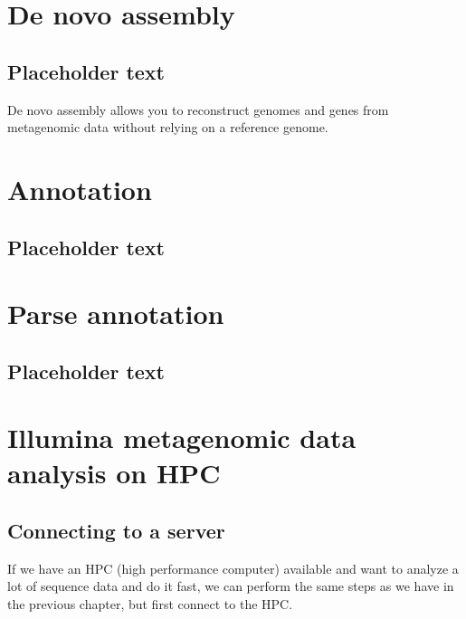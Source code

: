 \documentclass[
  letterpaper,
  DIV=11,
  numbers=noendperiod]{scrreprt}
\begin{document}

\chapter{De novo assembly}\label{de-novo-assembly}

\section{Placeholder text}\label{placeholder-text}

De novo assembly allows you to reconstruct genomes and genes from
metagenomic data without relying on a reference genome.


\chapter{Annotation}\label{annotation}

\section{Placeholder text}\label{placeholder-text-1}


\chapter{Parse annotation}\label{parse-annotation}

\section{Placeholder text}\label{placeholder-text-2}


\chapter{Illumina metagenomic data analysis on
HPC}\label{illumina-metagenomic-data-analysis-on-hpc}

\section{Connecting to a server}\label{connecting-to-a-server}

If we have an HPC (high performance computer) available and want to
analyze a lot of sequence data and do it fast, we can perform the same
steps as we have in the previous chapter, but first connect to the HPC.
\end{document}
